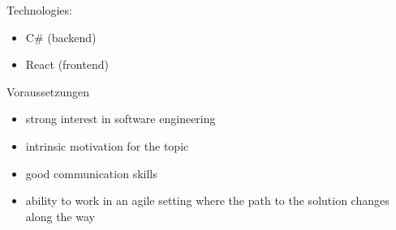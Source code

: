 Technologies:
\begin{itemize}
    \item C\# (backend)
    \item React (frontend)
\end{itemize}
Voraussetzungen
\begin{itemize}
    \item strong interest in software engineering
    \item intrinsic motivation for the topic
    \item good communication skills
    \item ability to work in an agile setting where the path to the solution changes along the way
\end{itemize}